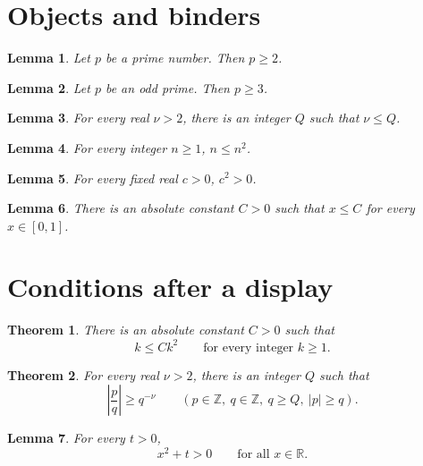 \documentclass{article}
\newcommand{\ZZ}{\mathbb{Z}}
\newtheorem{theorem}{Theorem}
\newtheorem{lemma}{Lemma}
\begin{document}
\section{Objects and binders}\label{sec:objects}

\begin{lemma}\label{prime}
Let $p$ be a prime number. Then $p\ge2$.
\end{lemma}

\begin{lemma}\label{odd-prime}
Let $p$ be an odd prime. Then $p\ge3$.
\end{lemma}

\begin{lemma}\label{integer-exists}
For every real $\nu>2$, there is an integer $Q$ such that $\nu\le Q$.
\end{lemma}

\begin{lemma}\label{bounded-binder}
For every integer $n\ge1$, $n\le n^2$.
\end{lemma}

\begin{lemma}\label{fixed}
For every fixed real $c>0$, $c^2>0$.
\end{lemma}

\begin{lemma}\label{absolute}
There is an absolute constant $C>0$ such that $x\le C$ for every $x\in[0,1]$.
\end{lemma}

\section{Conditions after a display}

\begin{theorem}\label{text-binder}
There is an absolute constant $C>0$ such that
\[
 k\le Ck^2\qquad\text{for every integer }k\ge1.
\]
\end{theorem}

\begin{theorem}\label{paren-binders}
For every real $\nu>2$, there is an integer $Q$ such that
\[
 \left|\frac pq\right|\ge q^{-\nu}
 \qquad(p\in\ZZ,\ q\in\ZZ,\ q\ge Q,\ |p|\ge q).
\]
\end{theorem}

\begin{lemma}\label{text-for-all}
For every $t>0$,
\[
 x^2+t>0\qquad\text{for all }x\in\mathbb R.
\]
\end{lemma}
\end{document}
